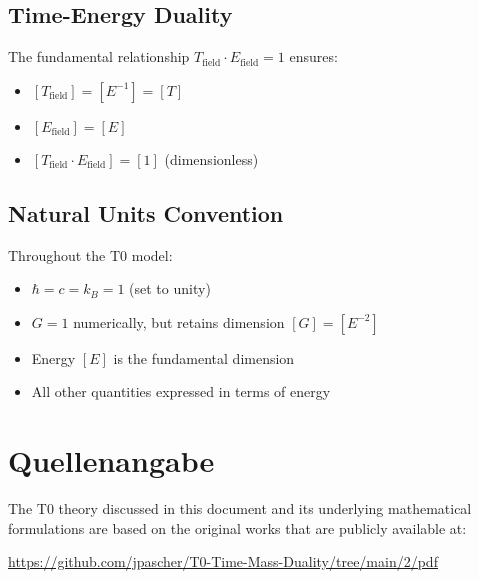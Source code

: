 \documentclass[12pt,a4paper]{report}
\begin{document}
\subsection{Time-Energy Duality}
The fundamental relationship $T_{\text{field}} \cdot E_{\text{field}} = 1$ ensures:
\begin{itemize}
	\item $[T_{\text{field}}] = [E^{-1}] = [T]$
	\item $[E_{\text{field}}] = [E]$
	\item $[T_{\text{field}} \cdot E_{\text{field}}] = [1]$ (dimensionless)
\end{itemize}

\subsection{Natural Units Convention}
Throughout the T0 model:
\begin{itemize}
	\item $\hbar = c = k_B = 1$ (set to unity)
	\item $G = 1$ numerically, but retains dimension $[G] = [E^{-2}]$
	\item Energy $[E]$ is the fundamental dimension
	\item All other quantities expressed in terms of energy
\end{itemize}
\section{Quellenangabe}

The T0 theory discussed in this document and its underlying mathematical formulations are based on the original works that are publicly available at:


\begin{center}
	\url{https://github.com/jpascher/T0-Time-Mass-Duality/tree/main/2/pdf}
\end{center}
\end{document}
